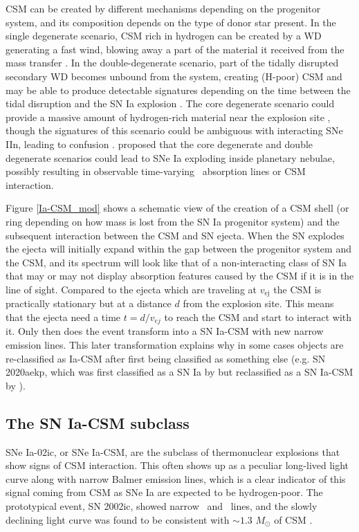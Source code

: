\documentclass[a4paper,oneside,12pt, class=Latex/Classes/PhDthesisPSnPDF, crop=false]{standalone}
\begin{document}
CSM can be created by different mechanisms depending on the progenitor system, and its composition depends on the type of donor star present. In the single degenerate scenario, CSM rich in hydrogen can be created by a WD generating a fast wind, blowing away a part of the material it received from the mass transfer \citep{single_degen_CSM_gen}. In the double-degenerate scenario, part of the tidally disrupted secondary WD becomes unbound from the system, creating (H-poor) CSM and may be able to produce detectable signatures depending on the time between the tidal disruption and the SN Ia explosion \citep{Double_degen_CSM_gen}. The core degenerate scenario could provide a massive amount of hydrogen-rich material near the explosion site \citep[e.g. for SN 2014J,][]{2014J_core_deg}, though the signatures of this scenario could be ambiguous with interacting SNe IIn, leading to confusion \citep{Inserra_2016}. \citet{snips} proposed that the core degenerate and double degenerate scenarios could lead to SNe Ia exploding inside planetary nebulae, possibly resulting in observable time-varying \NaID\ absorption lines or CSM interaction.

Figure \ref{Ia-CSM_mod} shows a schematic view of the creation of a CSM shell (or ring depending on how mass is lost from the SN Ia progenitor system) and the subsequent interaction between the CSM and SN ejecta. When the SN explodes the ejecta will initially expand within the gap between the progenitor system and the CSM, and its spectrum will look like that of a non-interacting class of SN Ia that may or may not display absorption features caused by the CSM if it is in the line of sight. Compared to the ejecta which are traveling at $v_\text{ej}$ the CSM is practically stationary but at a distance $d$ from the explosion site. This means that the ejecta need a time $t=d/v_{ej}$ to reach the CSM and start to interact with it. Only then does the event transform into a SN Ia-CSM with new narrow emission lines. This later transformation explains why in some cases objects are re-classified as Ia-CSM after first being classified as something else (e.g. SN 2020aekp, which was first classified as a SN Ia by \citealt{2020aekp_1st_classif} but reclassified as a SN Ia-CSM by \citealt{2020aekp_reclassif}).


\subsection{The SN Ia-CSM subclass}
\label{Ia_CSM}
SNe Ia-02ic, or SNe Ia-CSM, are the subclass of thermonuclear explosions that show signs of CSM interaction. This often shows up as a peculiar long-lived light curve along with narrow Balmer emission lines, which is a clear indicator of this signal coming from CSM as SNe Ia are expected to be hydrogen-poor. The prototypical event, SN 2002ic, showed narrow \Halpha\ and \Hbeta\ lines, and the slowly declining light curve was found to be consistent with $\sim1.3$ $M_\odot$ of CSM \citep{02ic_H_det, Hamuy_02ic, 02ic_slow_decay, single_degen_CSM_gen}.
\end{document}
